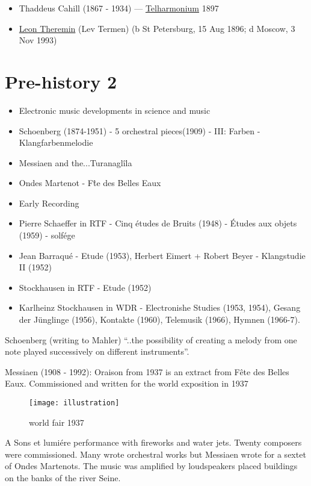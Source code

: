\begin{itemize}
\item Thaddeus Cahill (1867 - 1934) --- \href{http://www.grovemusic.com/shared/views/article.html?section=music.46183}{Telharmonium} 1897
\item \href{http://www.grovemusic.com/shared/views/article.html?section=music.45834}{Leon Theremin} (Lev Termen) (b St Petersburg, 15 Aug 1896; d Moscow, 3 Nov 1993)
\end{itemize}

\section{Pre-history 2}
\begin{itemize}
\item Electronic music developments in science and music
\item Schoenberg (1874-1951) - 5 orchestral pieces(1909) - III: Farben - Klangfarbenmelodie
\item Messiaen and the...Turanaglîla
\item Ondes Martenot - F\^te des Belles Eaux
\item Early Recording
\item Pierre Schaeffer in RTF - Cinq \'etudes de Bruits (1948) - \'Etudes aux objets (1959) - solfége
\item Jean Barraqu\'e - Etude (1953), Herbert Eimert + Robert Beyer - Klangstudie II (1952)
\item Stockhausen in RTF - Etude (1952)
\item Karlheinz Stockhausen in WDR - Electronishe Studies (1953, 1954), Gesang der J\"unglinge (1956), Kontakte (1960), Telemusik (1966), Hymnen (1966-7).
\end{itemize}

Schoenberg (writing to Mahler) ``..the possibility of creating a melody from one note played successively on different instruments''.

Messiaen (1908 - 1992): Oraison from 1937 is an extract from F\^ete des Belles Eaux. Commissioned and written for the world exposition in 1937

\begin{figure}[H]
\centering
\texttt{[image: illustration]}\caption{world fair 1937}
\label{fig:worldfair}
\end{figure}

A Sons et lumi\'ere performance with fireworks and water jets. Twenty composers were commissioned. Many wrote orchestral works but Messiaen wrote for a sextet of Ondes Martenots. The music was amplified by loudspeakers placed buildings on the banks of the river Seine.


